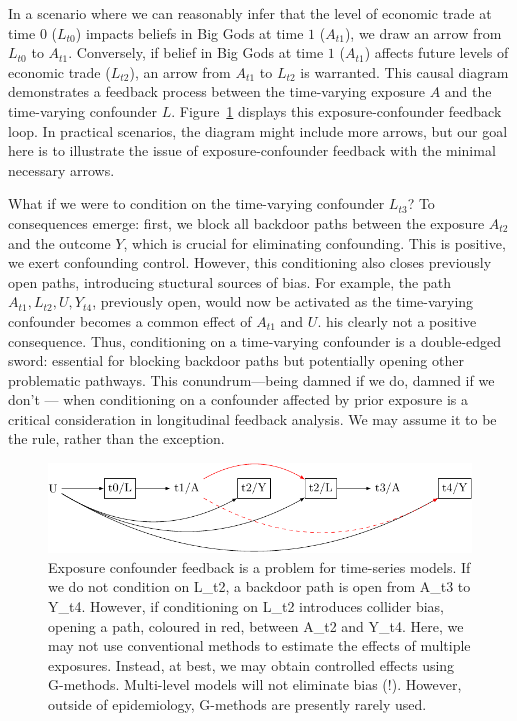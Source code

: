 \documentclass[
  singlecolumn,
  9pt]{article}
\begin{document}
In a scenario where we can reasonably infer that the level of economic
trade at time \(0\) (\(L_{t0}\)) impacts beliefs in Big Gods at time
\(1\) (\(A_{t1}\)), we draw an arrow from \(L_{t0}\) to \(A_{t1}\).
Conversely, if belief in Big Gods at time \(1\) (\(A_{t1}\)) affects
future levels of economic trade (\(L_{t2}\)), an arrow from \(A_{t1}\)
to \(L_{t2}\) is warranted. This causal diagram demonstrates a feedback
process between the time-varying exposure \(A\) and the time-varying
confounder \(L\). Figure~\ref{fig-dag-9} displays this
exposure-confounder feedback loop. In practical scenarios, the diagram
might include more arrows, but our goal here is to illustrate the issue
of exposure-confounder feedback with the minimal necessary arrows.

What if we were to condition on the time-varying confounder \(L_{t3}\)?
To consequences emerge: first, we block all backdoor paths between the
exposure \(A_{t2}\) and the outcome \(Y\), which is crucial for
eliminating confounding. This is positive, we exert confounding control.
However, this conditioning also closes previously open paths,
introducing stuctural sources of bias. For example, the path
\(A_{t1}, L_{t2}, U, Y_{t4}\), previously open, would now be activated
as the time-varying confounder becomes a common effect of \(A_{t1}\) and
\(U\). his clearly not a positive consequence. Thus, conditioning on a
time-varying confounder is a double-edged sword: essential for blocking
backdoor paths but potentially opening other problematic pathways. This
conundrum---being damned if we do, damned if we don't --- when
conditioning on a confounder affected by prior exposure is a critical
consideration in longitudinal feedback analysis. We may assume it to be
the rule, rather than the exception.

\begin{figure}

{\centering \includegraphics[width=1\textwidth,height=\textheight]{causal-dags_files/figure-pdf/fig-dag-9-1.pdf}

}

\caption{\label{fig-dag-9}Exposure confounder feedback is a problem for
time-series models. If we do not condition on L\_t2, a backdoor path is
open from A\_t3 to Y\_t4. However, if conditioning on L\_t2 introduces
collider bias, opening a path, coloured in red, between A\_t2 and Y\_t4.
Here, we may not use conventional methods to estimate the effects of
multiple exposures. Instead, at best, we may obtain controlled effects
using G-methods. Multi-level models will not eliminate bias (!).
However, outside of epidemiology, G-methods are presently rarely used.}

\end{figure}
\end{document}
